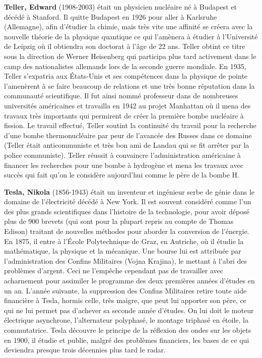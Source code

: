 \textbf{Teller, Edward} (1908-2003) était un physicien nucléaire né à Budapest et décédé à Stanford. Il quitte Budapest en 1926 pour aller à Karlsruhe (Allemagne), afin d'étudier la chimie, mais très vite une affinité se créera avec la nouvelle théorie de la physique quantique ce qui l'amènera à étudier à l'Université de Leipzig où il obtiendra son doctorat à l'âge de 22 ans. Teller obtint ce titre sous la direction de Werner Heisenberg qui participa plus tard activement dans le camp des nationalistes allemands lors de la seconde guerre mondiale. En 1935, Teller s'expatria aux États-Unis et ses compétences dans la physique de pointe l'amenèrent à se faire beaucoup de relations et une très bonne réputation dans la communauté scientifique. Il fut ainsi nommé professeur dans de nombreuses universités américaines et travailla en 1942 au projet Manhattan où il mena des travaux très importants qui permirent de créer la première bombe nucléaire à fission. Le travail effectué, Teller soutint la continuité du travail pour la recherche d'une bombe thermonucléaire par peur de l'avancée des Russes dans ce domaine (Teller était anticommuniste et très bon ami de Landau qui se fit arrêter par la police communiste). Teller réussit à convaincre l'administration américaine à financer les recherches pour une bombe à hydrogène et mena les travaux avec succès qui fait qu'on le considère aujourd'hui comme le père de la bombe H.

\textbf{Tesla, Nikola} (1856-1943) était un inventeur et ingénieur serbe de génie dans le domaine de l'électricité décédé à New York. Il est souvent considéré comme l'un des plus grands scientifiques dans l'histoire de la technologie, pour avoir déposé plus de 900 brevets (qui sont pour la plupart repris au compte de Thomas Edison) traitant de nouvelles méthodes pour aborder la conversion de l'énergie. En 1875, il entre à l'École Polytechnique de Graz, en Autriche, où il étudie la mathématique, la physique et la mécanique. Une bourse lui est attribuée par l'administration des Confins Militaires (Vojna Krajina), le mettant à l'abri des problèmes d'argent. Ceci ne l'empêche cependant pas de travailler avec acharnement pour assimiler le programme des deux premières années d'études en un an. L'année suivante, la suppression des Confins Militaires retire toute aide financière à Tesla, hormis celle, très maigre, que peut lui apporter son père, ce qui ne lui permet pas d'achever sa seconde année d'études. On lui doit le moteur électrique asynchrone, l'alternateur polyphasé, le montage triphasé en étoile, la commutatrice. Tesla découvre le principe de la réflexion des ondes sur les objets en 1900, il étudie et publie, malgré des problèmes financiers, les bases de ce qui deviendra presque trois décennies plus tard le radar.

